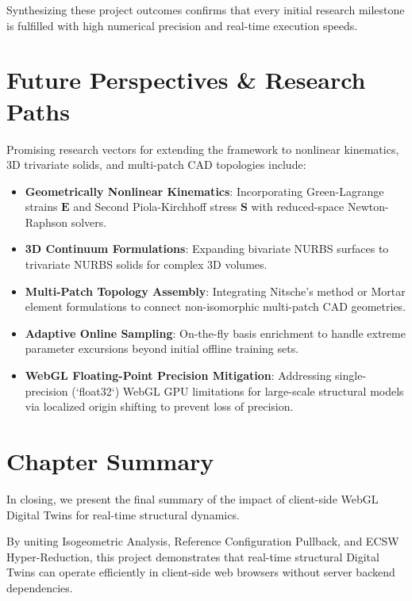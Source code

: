 Synthesizing these project outcomes confirms that every initial research milestone is fulfilled with high numerical precision and real-time execution speeds.

\section{Future Perspectives \& Research Paths}

Promising research vectors for extending the framework to nonlinear kinematics, 3D trivariate solids, and multi-patch CAD topologies include:

\begin{itemize}[leftmargin=*]
    \item \textbf{Geometrically Nonlinear Kinematics}: Incorporating Green-Lagrange strains $\mathbf{E}$ and Second Piola-Kirchhoff stress $\mathbf{S}$ with reduced-space Newton-Raphson solvers.
    \item \textbf{3D Continuum Formulations}: Expanding bivariate NURBS surfaces to trivariate NURBS solids for complex 3D volumes.
    \item \textbf{Multi-Patch Topology Assembly}: Integrating Nitsche's method or Mortar element formulations to connect non-isomorphic multi-patch CAD geometries.
    \item \textbf{Adaptive Online Sampling}: On-the-fly basis enrichment to handle extreme parameter excursions beyond initial offline training sets.
    \item \textbf{WebGL Floating-Point Precision Mitigation}: Addressing single-precision (`float32`) WebGL GPU limitations for large-scale structural models via localized origin shifting to prevent loss of precision.
\end{itemize}
\newpage
\section{Chapter Summary}

In closing, we present the final summary of the impact of client-side WebGL Digital Twins for real-time structural dynamics.

\begin{tcolorbox}[colback=lightbg, colframe=accentcyan, title=\textbf{Key Takeaway}, fonttitle=\bfseries]
    By uniting Isogeometric Analysis, Reference Configuration Pullback, and ECSW Hyper-Reduction, this project demonstrates that real-time structural Digital Twins can operate efficiently in client-side web browsers without server backend dependencies.
\end{tcolorbox}
